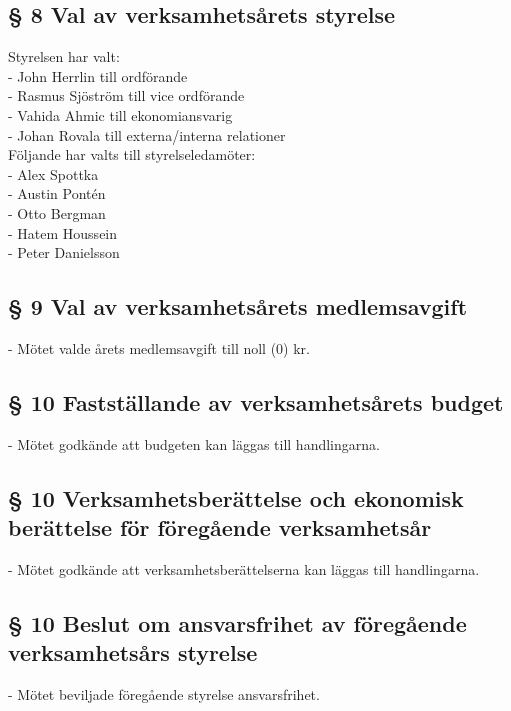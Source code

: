 \documentclass[11pt,swedish]{article}
\begin{document}
\clearpage
\subsection{§ 8 \hspace{10mm} Val av verksamhetsårets styrelse}
	Styrelsen har valt: \\
	- John Herrlin till ordförande \\
	- Rasmus Sjöström till vice ordförande \\
	- Vahida Ahmic till ekonomiansvarig \\
	- Johan Rovala till externa/interna  relationer \\
	
	\noindent Följande har valts till styrelseledamöter: \\
	- Alex Spottka \\
	- Austin Pontén \\
	- Otto Bergman \\
	- Hatem Houssein \\
	- Peter Danielsson \\
	
\subsection{§ 9 \hspace{10mm} Val av verksamhetsårets medlemsavgift}
	- Mötet valde årets medlemsavgift till noll (0) kr.
	
\subsection{§ 10 \hspace{10mm} Fastställande av verksamhetsårets budget}
	- Mötet godkände att budgeten kan läggas till handlingarna.
	
\subsection{§ 10 \hspace{10mm} Verksamhetsberättelse och ekonomisk berättelse för föregående verksamhetsår }
	- Mötet godkände att verksamhetsberättelserna kan läggas till handlingarna.
	
\subsection{§ 10 \hspace{10mm} Beslut om ansvarsfrihet av föregående verksamhetsårs styrelse}
	- Mötet beviljade föregående styrelse ansvarsfrihet.
\end{document}
